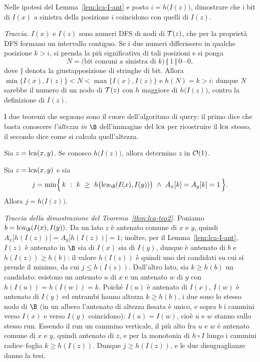 \begin{esercizio}\label{ex:lca-bit-sx}
  Nelle ipotesi del Lemma~\ref{lem:lca-I-ant} e posto $i=h\bigl(I(z)\bigr)$, dimostrare
  che i bit di $I(x)$ a sinistra della posizione $i$ coincidono con quelli di $I(z)$.
\end{esercizio}

\emph{Traccia.} $I(x)$ e $I(z)$ sono numeri DFS di nodi di $\mathcal{T}(z)$, che per la
proprietà DFS formano un intervallo contiguo. Se i due numeri differissero in qualche
posizione $k>i$, si prenda la più significativa di tali posizioni e si ponga
\[
  N=\bigl(\text{bit comuni a sinistra di }k\bigr)\,\Vert\,1\,\Vert\,0\cdots 0 ,
\]
dove $\Vert$ denota la giustapposizione di stringhe di bit. Allora $\min\{I(x),I(z)\}<N<\max\{I(x),I(z)\}$ e $h(N)=k>i$: dunque $N$ sarebbe il
numero di un nodo di $\mathcal{T}(z)$ con $h$ maggiore di $h\bigl(I(z)\bigr)$, contro la
definizione di $I(z)$.

\bigskip

I due teoremi che seguono sono il cuore dell'algoritmo di query: il primo dice che
basta conoscere \emph{l'altezza in $\B$} dell'immagine del $\operatorname{lca}$ per ricostruire il
$\operatorname{lca}$ stesso, il secondo dice come si calcola quell'altezza.

\begin{teorema}\label{thm:lca-teo1}
  Sia $z=\operatorname{lca}(x,y)$. Se conosco $h\bigl(I(z)\bigr)$, allora determino $z$ in $\mathcal{O}(1)$.
\end{teorema}

\begin{teorema}[determinare $h(I(z))$ da $A_x$ e $A_y$]\label{thm:lca-teo2}
  Sia $z=\operatorname{lca}(x,y)$ e sia
  \[
    j=\min\Bigl\{\,k\ :\ k\ \ge\ h\bigl(\lca_{\B}(I(x),I(y))\bigr)
    \ \wedge\ A_x[k]=A_y[k]=1\,\Bigr\}.
  \]
  Allora $j=h\bigl(I(z)\bigr)$.
\end{teorema}

\emph{Traccia della dimostrazione del Teorema~\ref{thm:lca-teo2}.} Poniamo
$b=\lca_{\B}(I(x),I(y))$. Da un lato $z$ è antenato comune di $x$ e $y$, quindi
$A_x\bigl[h(I(z))\bigr]=A_y\bigl[h(I(z))\bigr]=1$; inoltre, per il
Lemma~\ref{lem:lca-I-ant}, $I(z)$ è antenato in $\B$ sia di $I(x)$ sia di $I(y)$, dunque
è antenato di $b$ e $h(I(z))\ge h(b)$: il valore $h(I(z))$ è quindi uno dei candidati
su cui si prende il minimo, da cui $j\le h(I(z))$. Dall'altro lato, sia $k\ge h(b)$ un
candidato: esistono un antenato $u$ di $x$ e un antenato $w$ di $y$ con
$h(I(u))=h(I(w))=k$. Poiché $I(u)$ è antenato di $I(x)$, $I(w)$ è antenato di $I(y)$ ed
entrambi hanno altezza $k\ge h(b)$, i due sono lo stesso nodo di $\B$ (in un albero
l'antenato di altezza fissata è unico, e sopra $b$ i cammini verso $I(x)$ e verso
$I(y)$ coincidono): $I(u)=I(w)$, cioè $u$ e $w$ stanno sullo stesso run. Essendo il run
un cammino verticale, il più alto fra $u$ e $w$ è antenato
comune di $x$ e $y$, quindi antenato di $z$, e per
la monotonia di $h\circ I$ lungo i cammini radice--foglia $k\ge h(I(z))$. Dunque $j\ge h(I(z))$, e le due
disuguaglianze danno la tesi.

